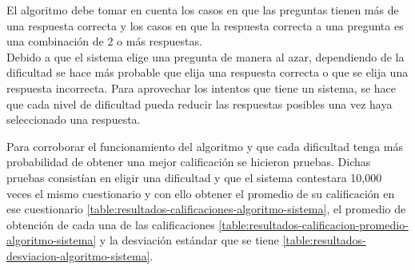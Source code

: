 \clearpage
    El algoritmo debe tomar en cuenta los casos en que las preguntas tienen más de una respuesta correcta
    y los casos en que la respuesta correcta a una pregunta es una combinación de 2 o más respuestas.\\
\clearpage
    Debido a que el sistema elige una pregunta de manera al azar,
    dependiendo de la dificultad se hace más probable que elija una respuesta correcta o que se elija una respuesta incorrecta.
\clearpage
    Para aprovechar los intentos que tiene un sistema,
    se hace que cada nivel de dificultad pueda reducir las respuestas posibles una vez haya seleccionado una respuesta.
\clearpage


\noindent Para corroborar el funcionamiento del algoritmo y que cada dificultad tenga más probabilidad de obtener una mejor calificación se hicieron pruebas.
Dichas pruebas consistían en eligir una dificultad y que el sistema contestara 10,000 veces el mismo cuestionario y con ello obtener
el promedio de su calificación en ese cuestionario \ref{table:resultados-calificaciones-algoritmo-sistema},
el promedio de obtención de cada una de las calificaciones  \ref{table:resultados-calificacion-promedio-algoritmo-sistema}
y la desviación estándar que se tiene \ref{table:resultados-desviacion-algoritmo-sistema}.\\

